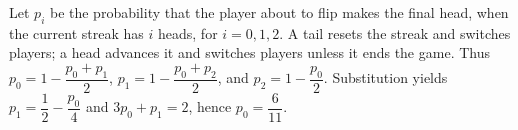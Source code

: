 Let $p_i$ be the probability that the player about to flip makes the final head, when the current streak has $i$ heads, for $i=0,1,2$. A tail resets the streak and switches players; a head advances it and switches players unless it ends the game. Thus $p_0=1-\dfrac{p_0+p_1}{2}$, $p_1=1-\dfrac{p_0+p_2}{2}$, and $p_2=1-\dfrac{p_0}{2}$. Substitution yields $p_1=\dfrac{1}{2}-\dfrac{p_0}{4}$ and $3p_0+p_1=2$, hence $\boxed{p_0=\dfrac{6}{11}}$.
